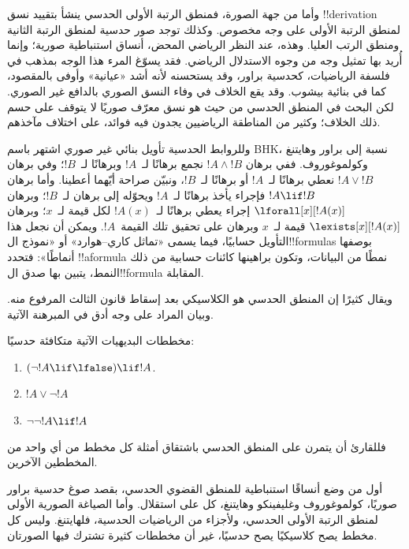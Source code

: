 \documentclass[../../../include/open-logic-section]{subfiles}
\begin{document}
وأما من جهة الصورة، فمنطق الرتبة الأولى الحدسي ينشأ بتقييد
نسق !!{derivation} لمنطق الرتبة الأولى على وجه مخصوص. وكذلك
توجد صور حدسية لمنطق الرتبة الثانية ومنطق الرتب العليا. وهذه،
عند النظر الرياضي المحض، أنساق استنباطية صورية؛ وإنما أُريد بها
تمثيل وجه من وجوه الاستدلال الرياضي. فقد يسوّغ المرء هذا الوجه
بمذهب في فلسفة الرياضيات، كحدسية براور، وقد يستحسنه لأنه أشد
«عيانية» وأوفى بالمقصود، كما في بنائية بيشوب. وقد يقع الخلاف في
وفاء النسق الصوري بالدافع غير الصوري. لكن البحث في المنطق الحدسي
من حيث هو نسق معرّف صوريًا لا يتوقف على حسم ذلك الخلاف؛ وكثير
من المناطقة الرياضيين يجدون فيه فوائد، على اختلاف مآخذهم.

وللروابط الحدسية تأويل بنائي غير صوري اشتهر باسم BHK، نسبة
إلى براور وهايتنغ وكولموغوروف. ففي برهان $!A \land
!B$ نجمع برهانًا لـ~$!A$ وبرهانًا لـ~$!B$؛ وفي برهان $!A \lor !B$
نعطي برهانًا لـ~$!A$ أو برهانًا لـ~$!B$، ونبيّن صراحة أيّهما
أعطينا. وأما برهان $!A \lif !B$ فإجراء يأخذ برهانًا لـ~$!A$
ويحوّله إلى برهان لـ~$!B$؛ وبرهان $\lforall[x][!A(x)]$ إجراء
يعطي برهانًا لـ~$!A(x)$ لكل قيمة لـ~$x$؛ وبرهان $\lexists[x][!A(x)]$
قيمة لـ~$x$ وبرهان على تحقيق تلك القيمة~$!A$. ويمكن أن نجعل
هذا التأويل حسابيًا، فيما يسمى «تماثل كاري--هوارد» أو «نموذج
ال!!{formula}s بوصفها أنماطًا»: فتحدد !!a{formula} نمطًا من
البيانات، وتكون براهينها كائنات حسابية من ذلك النمط، يتبين بها
صدق ال!!{formula} المقابلة.

ويقال كثيرًا إن المنطق الحدسي هو الكلاسيكي بعد إسقاط قانون
الثالث المرفوع منه. وبيان المراد على وجه أدق في المبرهنة الآتية.
\begin{thm}
مخططات البديهيات الآتية متكافئة حدسيًا:
\begin{enumerate}
\item $(\lnot !A \lif \lfalse) \lif !A$.
\item $!A \lor \lnot !A$
\item $\lnot \lnot !A \lif !A$
\end{enumerate}
\end{thm}
فللقارئ أن يتمرن على المنطق الحدسي باشتقاق أمثلة كل مخطط من
أي واحد من المخططين الآخرين.

أول من وضع أنساقًا استنباطية للمنطق القضوي الحدسي، بقصد صوغ
حدسية براور صوريًا، كولموغوروف وغليفينكو وهايتنغ، كل على استقلال.
وأما الصياغة الصورية الأولى لمنطق الرتبة الأولى الحدسي، ولأجزاء
من الرياضيات الحدسية، فلهايتنغ. وليس كل مخطط يصح كلاسيكيًا يصح
حدسيًا، غير أن مخططات كثيرة تشترك فيها الصورتان.
\end{document}
